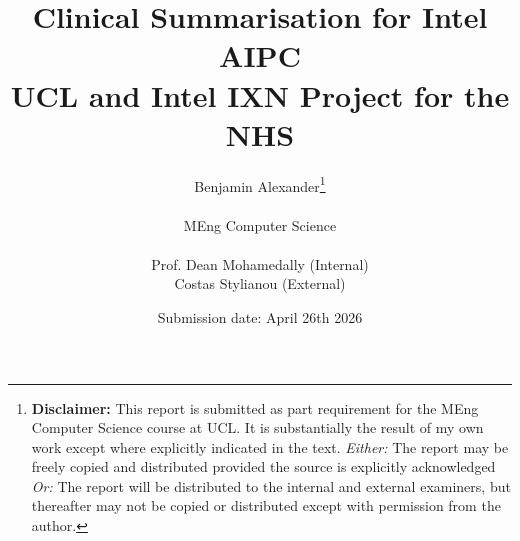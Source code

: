 \documentclass[a4paper]{report}
\title{
{{\Huge Clinical Summarisation for Intel AIPC}}\\
{\large UCL and Intel IXN Project for the NHS}\\
}
\date{Submission date: April 26th 2026}
\author{Benjamin Alexander\thanks{
{\bf Disclaimer:}
This report is submitted as part requirement for the MEng Computer Science course at UCL. It is
substantially the result of my own work except where explicitly indicated in the text.
\newline
\emph{Either:} The report may be freely copied and distributed provided the source is explicitly acknowledged
\newline  %
\emph{Or:}
The report will be distributed to the internal and external examiners, but thereafter may not be copied or distributed except with permission from the author.}
\\ \\
MEng Computer Science\\ \\
Prof. Dean Mohamedally (Internal)\\
Costas Stylianou (External)}
\begin{document}
 
\onehalfspacing
\maketitle
\begin{abstract}

\end{abstract}
\tableofcontents
\setcounter{page}{1}








\end{document}
